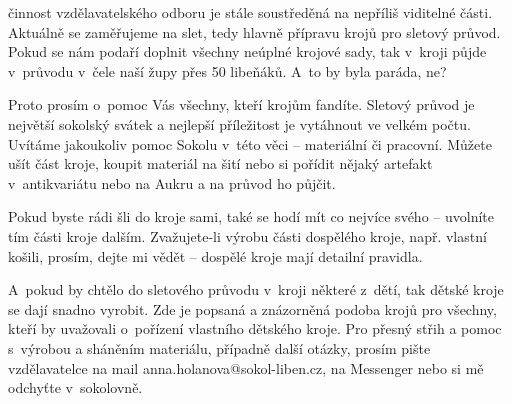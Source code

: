 \documentclass[11pt]{article}
\begin{document}
činnost vzdělavatelského odboru je stále soustředěná na nepříliš viditelné části. 
Aktuálně se zaměřujeme na slet, tedy hlavně přípravu krojů pro sletový průvod. Pokud se nám podaří doplnit všechny neúplné krojové sady, tak v~kroji půjde v~průvodu v~čele naší župy přes 50 libeňáků. A~to by byla paráda, ne?

Proto prosím o~pomoc Vás všechny, kteří krojům fandíte. Sletový průvod je největší sokolský svátek a nejlepší příležitost je vytáhnout ve velkém počtu. Uvítáme jakoukoliv pomoc Sokolu v~této věci – materiální či pracovní. Můžete ušít část kroje, koupit materiál na šití nebo si pořídit nějaký artefakt v~antikvariátu nebo na Aukru a na průvod ho půjčit.

Pokud byste rádi šli do kroje sami, také se hodí mít co nejvíce svého – uvolníte tím části kroje dalším. Zvažujete-li výrobu části dospělého kroje, např. vlastní košili, prosím, dejte mi vědět – dospělé kroje mají detailní pravidla.

A~pokud by chtělo do sletového průvodu v~kroji některé z~dětí, tak dětské kroje se dají snadno vyrobit. Zde je popsaná a znázorněná podoba krojů pro všechny, kteří by uvažovali o~pořízení vlastního dětského kroje. Pro přesný střih a pomoc s~výrobou a sháněním materiálu, případně další otázky, prosím pište vzdělavatelce na mail anna.holanova@sokol-liben.cz, na Messenger nebo si mě odchyťte v~sokolovně.

\vspace*{24pt}
\end{document}
